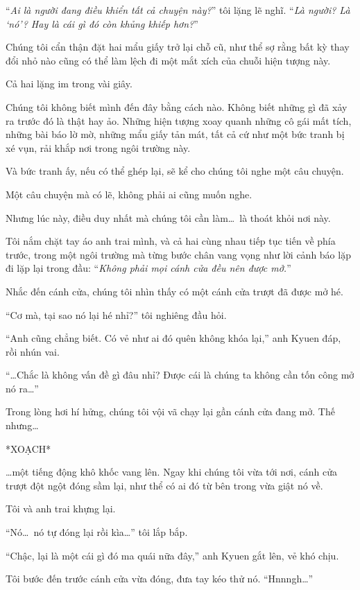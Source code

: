 \documentclass[../main.tex]{subfiles}
\begin{document}
``\textit{Ai là người đang điều khiển tất cả chuyện này?}'' tôi lặng lẽ nghĩ. ``\textit{Là người? Là `nó'? Hay là cái gì đó còn khủng khiếp hơn?}''

Chúng tôi cẩn thận đặt hai mẩu giấy trở lại chỗ cũ, như thể sợ rằng bất kỳ thay đổi nhỏ nào cũng có thể làm lệch đi một mắt xích của chuỗi hiện tượng này.

Cả hai lặng im trong vài giây.

Chúng tôi không biết mình đến đây bằng cách nào. Không biết những gì đã xảy ra trước đó là thật hay ảo. Những hiện tượng xoay quanh những cô gái mất tích, những bài báo lờ mờ, những mẩu giấy tản mát, tất cả cứ như một bức tranh bị xé vụn, rải khắp nơi trong ngôi trường này.

Và bức tranh ấy, nếu có thể ghép lại, sẽ kể cho chúng tôi nghe một câu chuyện.

Một câu chuyện mà có lẽ, không phải ai cũng muốn nghe.

Nhưng lúc này, điều duy nhất mà chúng tôi cần làm\dots\ là thoát khỏi nơi này.

Tôi nắm chặt tay áo anh trai mình, và cả hai cùng nhau tiếp tục tiến về phía trước, trong một ngôi trường mà từng bước chân vang vọng như lời cảnh báo lặp đi lặp lại trong đầu: ``\emph{Không phải mọi cánh cửa đều nên được mở.}''

Nhắc đến cánh cửa, chúng tôi nhìn thấy có một cánh cửa trượt đã được mở hé.

``Cơ mà, tại sao nó lại hé nhỉ?'' tôi nghiêng đầu hỏi.

``Anh cũng chẳng biết. Có vẻ như ai đó quên không khóa lại,'' anh Kyuen đáp, rồi nhún vai.

``\dots Chắc là không vấn đề gì đâu nhỉ? Được cái là chúng ta không cần tốn công mở nó ra\dots''

Trong lòng hơi hí hửng, chúng tôi vội vã chạy lại gần cánh cửa đang mở. Thế nhưng\dots

*XOẠCH*

\dots một tiếng động khô khốc vang lên. Ngay khi chúng tôi vừa tới nơi, cánh cửa trượt đột ngột đóng sầm lại, như thể có ai đó từ bên trong vừa giật nó về.


Tôi và anh trai khựng lại.

``Nó\dots\ nó tự đóng lại rồi kìa\dots'' tôi lắp bắp.

``Chậc, lại là một cái gì đó ma quái nữa đây,'' anh Kyuen gắt lên, vẻ khó chịu.

Tôi bước đến trước cánh cửa vừa đóng, đưa tay kéo thử nó. ``Hnnngh\dots''
\end{document}
